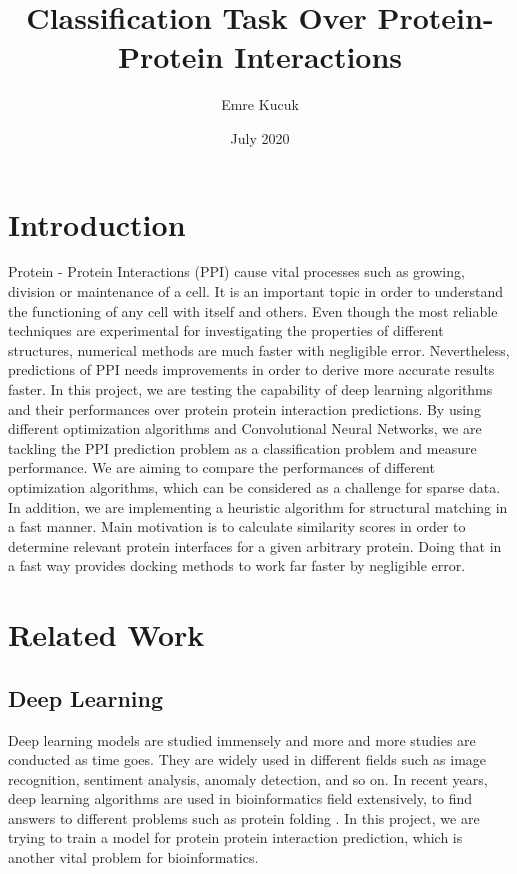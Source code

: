 \documentclass{article}
\title{Classification Task Over Protein-Protein Interactions}
\author{Emre Kucuk}
\date{July 2020}
\begin{document}
\maketitle

\section{Introduction}
Protein - Protein Interactions (PPI) cause vital processes such as growing, division or maintenance of a cell. It is an important topic in order to understand the functioning of any cell with itself and others. Even though the most reliable techniques are experimental for investigating the properties of different structures, numerical methods are much faster with negligible error. Nevertheless, predictions of PPI needs improvements in order to derive more accurate results faster. In this project, we are testing the capability of deep learning algorithms and their performances over protein protein interaction predictions. By using different optimization algorithms and Convolutional Neural Networks, we are tackling the PPI prediction problem as a classification problem and measure performance. We are aiming to compare the performances of different optimization algorithms, which can be considered as a challenge for sparse data. In addition, we are implementing a heuristic algorithm for structural matching in a fast manner. Main motivation is to calculate similarity scores in order to determine relevant protein interfaces for a given arbitrary protein. Doing that in a fast way provides docking methods to work far faster by negligible error.

\section{Related Work}
\subsection{Deep Learning}
Deep learning models are studied immensely and more and more studies are conducted as time goes. They are widely used in different fields such as image recognition, sentiment analysis, anomaly detection, and so on. In recent years, deep learning algorithms are used in bioinformatics field extensively, to find answers to different problems such as protein folding \citep{senior2020improved}. In this project, we are trying to train a model for protein protein interaction prediction, which is another vital problem for bioinformatics.
\end{document}
